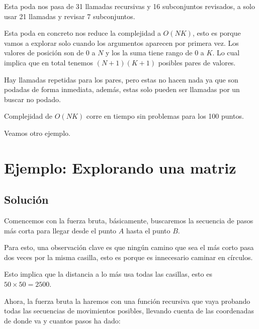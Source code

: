 Esta poda nos pasa de 31 llamadas recursivas y 16 subconjuntos revisados, a solo usar 21 llamadas y revisar 7 subconjuntos.

Esta poda en concreto nos reduce la complejidad a \(O(NK)\), esto es porque vamos a explorar solo cuando los argumentos aparecen por primera vez. Los valores de posición son de \(0\) a \(N\) y los la suma tiene rango de \(0\) a \(K\). Lo cual implica que en total tenemos \((N+1)(K+1)\) posibles pares de valores. 

Hay llamadas repetidas para los pares, pero estas no hacen nada ya que son podadas de forma inmediata, además, estas solo pueden ser llamadas por un buscar no podado.

Complejidad de \(O(NK)\) corre en tiempo sin problemas para los 100 puntos.

Veamos otro ejemplo.

\section*{Ejemplo: Explorando una matriz}



\subsection*{Solución}
Comencemos con la fuerza bruta, básicamente, buscaremos la secuencia de pasos más corta para llegar desde el punto \(A\) hasta el punto \(B\).

Para esto, una observación clave es que ningún camino que sea el más corto pasa dos veces por la misma casilla, esto es porque es innecesario caminar en círculos.

Esto implica que la distancia a lo más usa todas las casillas, esto es \(50\times50=2500\).

Ahora, la fuerza bruta la haremos con una función recursiva que vaya probando todas las secuencias de movimientos posibles, llevando cuenta de las coordenadas de donde va y cuantos pasos ha dado:

